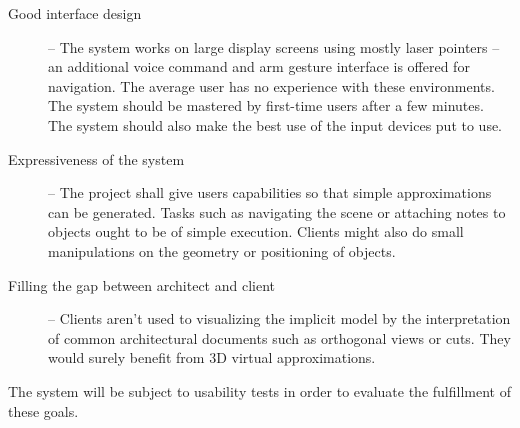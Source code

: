 
\begin{description}
	\item[Good interface design] --
		The system works on large display screens using mostly laser pointers
		-- an additional voice command and arm gesture interface is offered for navigation.
		The average user has no experience with these environments.
		The system should be mastered by first-time users after a few minutes.
		The system should also make the best use of the input devices put to use.
		
	\item[Expressiveness of the system] --
		The project shall give users capabilities so that simple approximations can be generated.
		Tasks such as navigating the scene or attaching notes to objects ought to be of simple execution.
		Clients might also do small manipulations on the geometry or positioning of objects.
	
	\item[Filling the gap between architect and client] --
		Clients aren't used to visualizing the implicit model by the interpretation of 
		common architectural documents such as orthogonal views or cuts.
		They would surely benefit from 3D virtual approximations.
\end{description}

The system will be subject to usability tests in order to evaluate the fulfillment of these goals.

